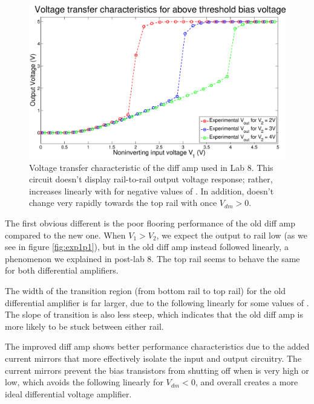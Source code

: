\begin{figure}[H]
\centering
\includegraphics[width=\linewidth]{../Figures/OldVTC.eps}
\caption{Voltage transfer characteristic of the diff amp used in Lab 8. This circuit doesn't display rail-to-rail output voltage response; rather, \Vout increases linearly with \Vin for negative values of \Vdm. In addition, \Vout doesn't change very rapidly towards the top rail with once $V_{dm} > 0$.}
\label{fig:oldvtc}
\end{figure}

The first obvious different is the poor flooring performance of the old diff amp compared to the new one. When $V_1 > V_2$, we expect the output to rail low (as we see in figure \ref{fig:exp1p1}), but in the old diff amp \Vout instead followed \Vone linearly, a phenomenon we explained in post-lab 8. The top rail seems to behave the same for both differential amplifiers.

The width of the transition region (from bottom rail to top rail) for the old differential amplifier is far larger, due to the \Vout following \Vone linearly for some values of \Vone. The slope of transition is also less steep, which indicates that the old diff amp is more likely to be stuck between either rail.

The improved diff amp shows better performance characteristics due to the added current mirrors that more effectively isolate the input and output circuitry. The current mirrors prevent the bias transistors from shutting off when \Vout is very high or low, which avoids the \Vout following \Vin linearly for $V_{dm} < 0$, and overall creates a more ideal differential voltage amplifier.